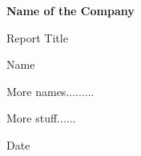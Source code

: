 \documentclass[11pt, oneside]{article}   	%
\begin{document}

\newpage

\begin{titlepage}

\Large
\sffamily

\begin{center}
  \textbf{\LARGE Name of the Company}
\end{center}

\vfill
\begin{center}
  \huge Report Title
\vspace{24pt}\\
\end{center}

\vspace*{2cm}
\centerline{\huge Name} 

\vfill

\begin{center}
  \large
 More names.........
\end{center}

\vfill
\begin{center}
    More stuff......
\end{center}
\vfill
\centerline{Date}
\end{titlepage}


\newpage
\end{document}

